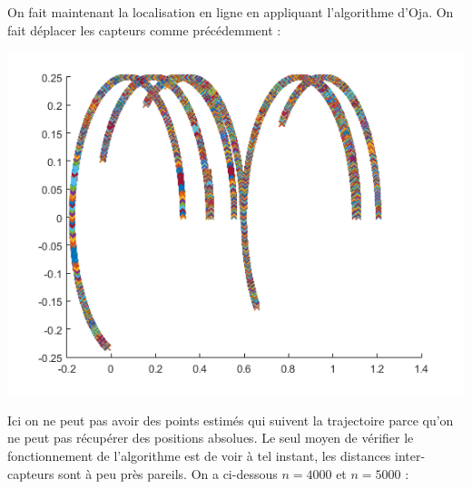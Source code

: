 \documentclass{article}
\begin{document}
On fait maintenant la localisation en ligne en appliquant l'algorithme d'Oja. On fait d\'eplacer les capteurs comme pr\'ec\'edemment :
\begin{center}
\includegraphics[scale=0.5]{oja.png}
\end{center}
Ici on ne peut pas avoir des points estim\'es qui suivent la trajectoire parce qu'on ne peut pas r\'ecup\'erer des positions absolues. Le seul
moyen de v\'erifier le fonctionnement de l'algorithme est de voir \`a tel instant, les distances inter-capteurs sont \`a peu pr\`es pareils.
On a ci-dessous $n=4000$ et	$n=5000$ :
\end{document}

